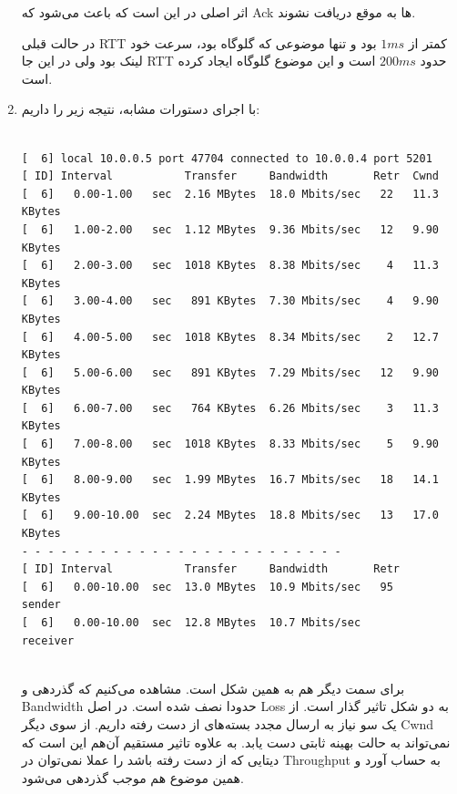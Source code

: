 \documentclass[12pt]{article}
\begin{document}
\begin{enumerate}
اثر اصلی  در این است که باعث می‌شود که Ack ها به موقع دریافت نشوند.

در حالت قبلی RTT کمتر از $1ms$ بود و تنها موضوعی که گلوگاه بود، سرعت خود لینک بود ولی در این جا RTT حدود $200ms$ است و این موضوع گلوگاه ایجاد کرده است.

\item


با اجرای دستورات مشابه، نتیجه زیر را داریم:

\begin{latin}
	\begin{Verbatim}

[  6] local 10.0.0.5 port 47704 connected to 10.0.0.4 port 5201
[ ID] Interval           Transfer     Bandwidth       Retr  Cwnd
[  6]   0.00-1.00   sec  2.16 MBytes  18.0 Mbits/sec   22   11.3 KBytes       
[  6]   1.00-2.00   sec  1.12 MBytes  9.36 Mbits/sec   12   9.90 KBytes       
[  6]   2.00-3.00   sec  1018 KBytes  8.38 Mbits/sec    4   11.3 KBytes       
[  6]   3.00-4.00   sec   891 KBytes  7.30 Mbits/sec    4   9.90 KBytes       
[  6]   4.00-5.00   sec  1018 KBytes  8.34 Mbits/sec    2   12.7 KBytes       
[  6]   5.00-6.00   sec   891 KBytes  7.29 Mbits/sec   12   9.90 KBytes       
[  6]   6.00-7.00   sec   764 KBytes  6.26 Mbits/sec    3   11.3 KBytes       
[  6]   7.00-8.00   sec  1018 KBytes  8.33 Mbits/sec    5   9.90 KBytes       
[  6]   8.00-9.00   sec  1.99 MBytes  16.7 Mbits/sec   18   14.1 KBytes       
[  6]   9.00-10.00  sec  2.24 MBytes  18.8 Mbits/sec   13   17.0 KBytes       
- - - - - - - - - - - - - - - - - - - - - - - - -
[ ID] Interval           Transfer     Bandwidth       Retr
[  6]   0.00-10.00  sec  13.0 MBytes  10.9 Mbits/sec   95             sender
[  6]   0.00-10.00  sec  12.8 MBytes  10.7 Mbits/sec                  receiver


	\end{Verbatim}
\end{latin}


برای سمت دیگر هم به همین شکل است. مشاهده‌ می‌کنیم که گذردهی و Bandwidth حدودا نصف شده است. 
در اصل Loss به دو شکل تاثیر گذار است. از یک سو نیاز به ارسال مجدد بسته‌های از دست رفته داریم. از سوی دیگر Cwnd نمی‌تواند به حالت بهینه ثابتی دست یابد. به علاوه تاثیر مستقیم آن‌هم این است که دیتایی که از دست رفته باشد را عملا نمی‌توان در Throughput به حساب آورد و همین موضوع هم موجب گذردهی می‌شود.



\end{enumerate}
\end{document}
